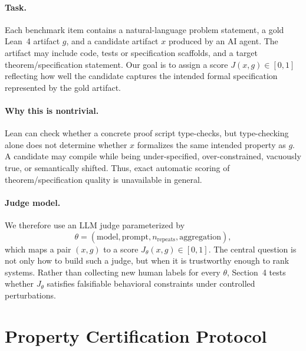 \documentclass{article}
\begin{document}
\paragraph{Task.}
Each benchmark item contains a natural-language problem statement, a gold Lean~4 artifact
$g$, and a candidate artifact $x$ produced by an AI agent. The artifact may include code,
tests or specification scaffolds, and a target theorem/specification statement. Our goal is
to assign a score $J(x,g) \in [0,1]$ reflecting how well the candidate captures the intended formal specification represented
by the gold artifact.

\paragraph{Why this is nontrivial.}
Lean can check whether a concrete proof script type-checks, but type-checking alone does
not determine whether $x$ formalizes the same intended property as $g$. A candidate may
compile while being under-specified, over-constrained, vacuously true, or semantically
shifted. Thus, exact automatic scoring of theorem/specification quality is unavailable in
general.

\paragraph{Judge model.}
We therefore use an LLM judge parameterized by
\[
  \theta = (\text{model}, \text{prompt}, n_{\mathrm{repeats}}, \text{aggregation}),
\]
which maps a pair $(x,g)$ to a score $J_\theta(x,g)\in[0,1]$. The central question is not
only how to build such a judge, but when it is trustworthy enough to rank systems. Rather
than collecting new human labels for every $\theta$, Section~4 tests whether $J_\theta$
satisfies falsifiable behavioral constraints under controlled perturbations.

\section{Property Certification Protocol}
\end{document}

